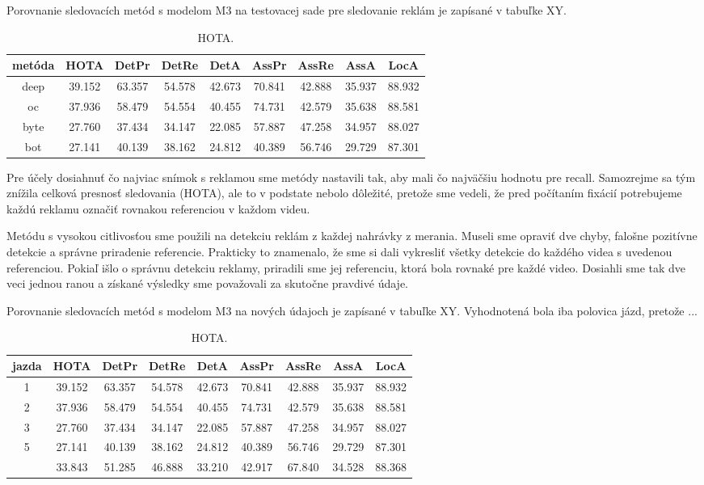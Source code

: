 Porovnanie sledovacích metód s modelom M3 na testovacej sade pre sledovanie reklám je zapísané v tabuľke XY.

\begin{table}
\centering
\begin{tabular}{|c c c c c c c c c|} 
 \hline
metóda & HOTA & DetPr & DetRe & DetA & AssPr & AssRe & AssA & LocA \\ [0.5ex] 
 \hline
deep & 39.152 & 63.357 & 54.578 & 42.673 & 70.841 & 42.888 & 35.937 & 88.932\\ [0.1ex]
oc & 37.936 & 58.479 & 54.554 & 40.455 & 74.731 & 42.579 & 35.638 & 88.581\\ [0.1ex]
byte & 27.760 & 37.434 & 34.147 & 22.085 & 57.887 & 47.258 & 34.957 & 88.027\\ [0.1ex]
bot & 27.141 & 40.139 & 38.162 & 24.812 & 40.389 & 56.746 & 29.729 & 87.301\\ [0.1ex]
 \hline
\end{tabular}
\caption{HOTA.}
\label{table:1}
\end{table}

Pre účely dosiahnuť čo najviac snímok s reklamou sme metódy nastavili tak, aby mali čo najväčšiu hodnotu pre recall. Samozrejme sa tým znížila celková presnosť sledovania (HOTA), ale to v podstate nebolo dôležité, pretože sme vedeli, že pred počítaním fixácií potrebujeme každú reklamu označiť rovnakou referenciou v každom videu.

Metódu s vysokou citlivosťou sme použili na detekciu reklám z každej nahrávky z merania. Museli sme opraviť dve chyby, falošne pozitívne detekcie a správne priradenie referencie. Prakticky to znamenalo, že sme si dali vykresliť všetky detekcie do každého videa s uvedenou referenciou. Pokiaľ išlo o správnu detekciu reklamy, priradili sme jej referenciu, ktorá bola rovnaké pre každé video. Dosiahli sme tak dve veci jednou ranou a získané výsledky sme považovali za skutočne pravdivé údaje.

Porovnanie sledovacích metód s modelom M3 na nových údajoch je zapísané v tabuľke XY. Vyhodnotená bola iba polovica jázd, pretože ...

\begin{table}
\centering
\begin{tabular}{|c c c c c c c c c|}
 \hline
jazda & HOTA & DetPr & DetRe & DetA & AssPr & AssRe & AssA & LocA \\ [0.5ex] 
 \hline
1 & 39.152 & 63.357 & 54.578 & 42.673 & 70.841 & 42.888 & 35.937 & 88.932\\ [0.1ex]
2 & 37.936 & 58.479 & 54.554 & 40.455 & 74.731 & 42.579 & 35.638 & 88.581\\ [0.1ex]
3 & 27.760 & 37.434 & 34.147 & 22.085 & 57.887 & 47.258 & 34.957 & 88.027\\ [0.1ex]
5 & 27.141 & 40.139 & 38.162 & 24.812 & 40.389 & 56.746 & 29.729 & 87.301\\ [0.1ex]
~ & 33.843 & 51.285 & 46.888 & 33.210 & 42.917 & 67.840 & 34.528 & 88.368\\ [0.1ex]
 \hline
\end{tabular}
\caption{HOTA.}
\label{table:1}
\end{table}

